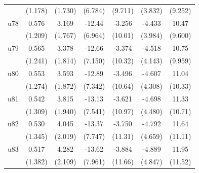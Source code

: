 \begin{table}[htbp]
\begin{tabular}{l*{6}{c}}
                    &     (1.178)         &     (1.730)         &     (6.784)         &     (9.711)         &     (3.832)         &     (9.252)         \\
\addlinespace
u78                 &       0.576         &       3.169\sym{*}  &      -12.44\sym{*}  &      -3.256         &      -4.433         &       10.47         \\
                    &     (1.209)         &     (1.767)         &     (6.964)         &     (10.01)         &     (3.984)         &     (9.600)         \\
\addlinespace
u79                 &       0.565         &       3.378\sym{*}  &      -12.66\sym{*}  &      -3.374         &      -4.518         &       10.75         \\
                    &     (1.241)         &     (1.814)         &     (7.150)         &     (10.32)         &     (4.143)         &     (9.959)         \\
\addlinespace
u80                 &       0.553         &       3.593\sym{*}  &      -12.89\sym{*}  &      -3.496         &      -4.607         &       11.04         \\
                    &     (1.274)         &     (1.872)         &     (7.342)         &     (10.64)         &     (4.308)         &     (10.33)         \\
\addlinespace
u81                 &       0.542         &       3.815\sym{**} &      -13.13\sym{*}  &      -3.621         &      -4.698         &       11.33         \\
                    &     (1.309)         &     (1.940)         &     (7.541)         &     (10.97)         &     (4.480)         &     (10.71)         \\
\addlinespace
u82                 &       0.530         &       4.045\sym{**} &      -13.37\sym{*}  &      -3.750         &      -4.792         &       11.64         \\
                    &     (1.345)         &     (2.019)         &     (7.747)         &     (11.31)         &     (4.659)         &     (11.11)         \\
\addlinespace
u83                 &       0.517         &       4.282\sym{**} &      -13.62\sym{*}  &      -3.884         &      -4.889         &       11.95         \\
                    &     (1.382)         &     (2.109)         &     (7.961)         &     (11.66)         &     (4.847)         &     (11.52)         \\

\end{tabular}
\end{table}
